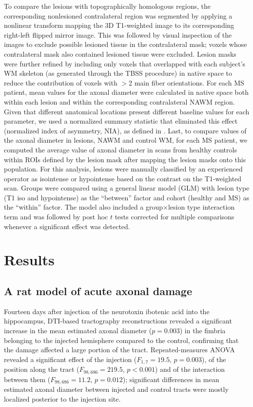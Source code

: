 \documentclass[11pt]{article}
\begin{document}
To compare the lesions with topographically homologous regions, the corresponding nonlesioned contralateral region was segmented by applying a nonlinear transform mapping the 3D T1-weighted image to its corresponding right-left flipped mirror image. This was followed by visual inspection of the images to exclude possible lesioned tissue in the contralateral mask; voxels whose contralateral mask also contained lesioned tissue were excluded. Lesion masks were further refined by including only voxels that overlapped with each subject's WM skeleton (as generated through the TBSS procedure) in native space to reduce the contribution of voxels with $>$2 main fiber orientations. For each MS patient, mean values for the axonal diameter were calculated in native space both within each lesion and within the corresponding contralateral NAWM region. Given that different anatomical locations present different baseline values for each parameter, we used a normalized summary statistic that eliminated this effect (normalized index of asymmetry, NIA), as defined in \cite{DeSantis2019a}. Last, to compare values of the axonal diameter in lesions, NAWM and control WM, for each MS patient, we computed the average value of axonal diameter in scans from healthy controls within ROIs defined by the lesion mask after mapping the lesion masks onto this population. For this analysis, lesions were manually classified by an experienced operator as isointense or hypointense based on the contrast on the T1-weighted scan. Groups were compared using a general linear model (GLM) with lesion type (T1 iso and hypointense) as the ``between'' factor and cohort (healthy and MS) as the ``within'' factor. The model also included a group$\times$lesion type interaction term and was followed by post hoc $t$ tests corrected for multiple comparisons whenever a significant effect was detected.

\section{Results}

\subsection{A rat model of acute axonal damage}
Fourteen days after injection of the neurotoxin ibotenic acid into the hippocampus, DTI-based tractography reconstructions revealed a significant increase in the mean estimated axonal diameter ($p=0.003$) in the fimbria belonging to the injected hemisphere compared to the control, confirming that the damage affected a large portion of the tract. Repeated-measures ANOVA revealed a significant effect of the injection ($F_{1,7}=19.5$, $p=0.003$), of the position along the tract ($F_{98,686}=219.5$, $p<0.001$) and of the interaction between them ($F_{98,686}=11.2$, $p=0.012$); significant differences in mean estimated axonal diameter between injected and control tracts were mostly localized posterior to the injection site.
\end{document}
